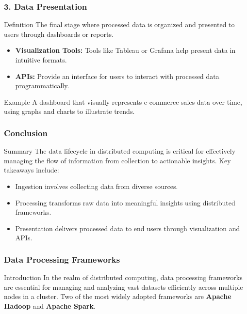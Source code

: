 \documentclass[aspectratio=169]{beamer}
\begin{document}
\begin{frame}
    \frametitle{3. Data Presentation}
    \begin{block}{Definition}
        The final stage where processed data is organized and presented to users through dashboards or reports.
    \end{block}
    \begin{itemize}
        \item \textbf{Visualization Tools:} Tools like Tableau or Grafana help present data in intuitive formats.
        \item \textbf{APIs:} Provide an interface for users to interact with processed data programmatically.
    \end{itemize}
    \begin{block}{Example}
        A dashboard that visually represents e-commerce sales data over time, using graphs and charts to illustrate trends.
    \end{block}
\end{frame}

\begin{frame}
    \frametitle{Conclusion}
    \begin{block}{Summary}
        The data lifecycle in distributed computing is critical for effectively managing the flow of information from collection to actionable insights. Key takeaways include:
    \end{block}
    \begin{itemize}
        \item Ingestion involves collecting data from diverse sources.
        \item Processing transforms raw data into meaningful insights using distributed frameworks.
        \item Presentation delivers processed data to end users through visualization and APIs.
    \end{itemize}
\end{frame}

\begin{frame}
    \frametitle{Data Processing Frameworks}
    \begin{block}{Introduction}
        In the realm of distributed computing, data processing frameworks are essential for managing and analyzing vast datasets efficiently across multiple nodes in a cluster. Two of the most widely adopted frameworks are \textbf{Apache Hadoop} and \textbf{Apache Spark}.
    \end{block}
\end{frame}
\end{document}
